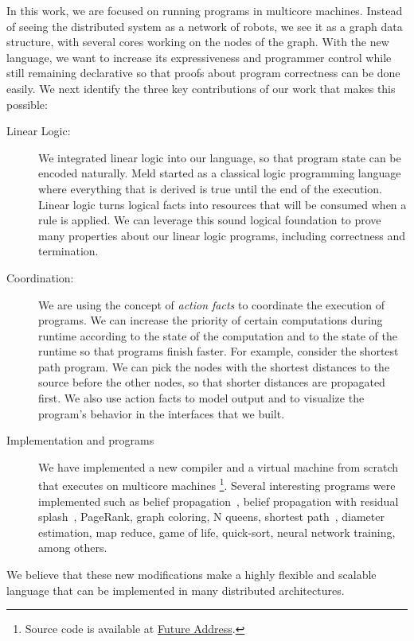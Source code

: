 In this work, we are focused on running \lang programs in multicore machines.
Instead of seeing the distributed system as a network of robots, we see it as a graph data structure,
with several cores working on the nodes of the graph. With the new language, we want to increase its expressiveness and
programmer control while still remaining declarative so that proofs about program correctness can be done easily.
We next identify the three key contributions of our work that makes this possible:

\begin{description}
   \item[Linear Logic:] We integrated linear logic into our language, so that program state can be encoded naturally.
   Meld started as a classical logic programming language where everything that is derived is true until the end
   of the execution. Linear logic turns logical facts into resources that will be consumed when a rule is applied.
   We can leverage this sound logical foundation to prove many properties about our linear logic programs, including correctness and termination.
   \item[Coordination:] We are using the concept of \emph{action facts} to coordinate the execution of programs.
   We can increase the priority of certain computations during runtime according to the state
   of the computation and to the state of the runtime so that programs finish faster.
   For example, consider the shortest path program. We can pick the nodes with the shortest
   distances to the source before the other nodes, so that shorter distances are propagated first.
   We also use action facts to model output and to visualize the program's behavior in the interfaces
   that we built.
   \item[Implementation and programs] We have implemented a new compiler and a virtual machine from scratch that executes on multicore machines
   \footnote{Source code is available at \url{Future Address}.}.
   Several interesting programs were implemented such as belief propagation~\cite{Gonzalez+al:aistats09paraml},
   belief propagation with residual splash~\cite{Gonzalez+al:aistats09paraml}, PageRank, graph coloring,
   N queens, shortest path~\cite{Dijkstra}, diameter estimation, map reduce, game of life, quick-sort, neural network training, among others.
\end{description}

We believe that these new modifications make \lang a highly flexible and scalable language that can be implemented
in many distributed architectures.

